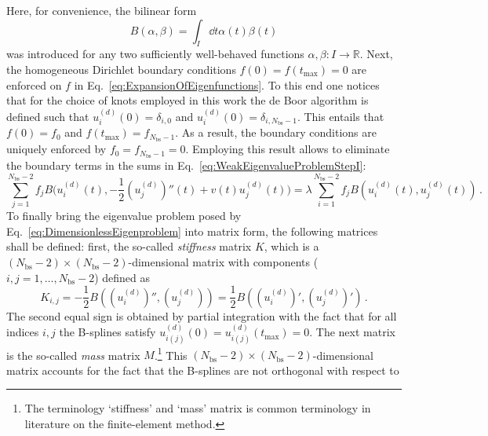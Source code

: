 \documentclass[fontsize=12pt,
               twoside=false,
               BCOR=0mm,
               DIV=14,
               overfullrule=false, %
               toc=bibliography,
               headinclude=true,
               footinclude=false]{scrartcl}
\numberwithin{equation}{section}
\begin{document}
    Here, for convenience, the bilinear form
    \begin{equation}\label{eq:BilinearForm}
        B(\alpha,\beta)
        =
        \int_I \dd{t} \alpha(t) \beta(t)
    \end{equation}
    was introduced for any two sufficiently well-behaved functions
    $\alpha,\beta\colon{I}\to\mathbb{R}$. Next, the homogeneous Dirichlet
    boundary conditions $f(0)=f(t_\mathrm{max})=0$ are enforced on $f$ in
    Eq.~\eqref{eq:ExpansionOfEigenfunctions}. To this end one notices that for
    the choice of knots employed in this work the de Boor algorithm
    \cite{deboor2001} is defined such that $u^{(d)}_i(0)=\delta_{i,0}$ and
    $u^{(d)}_i(0)=\delta_{i,N_\mathrm{bs}-1}$. This entails that $f(0)=f_0$ and
    $f(t_\mathrm{max})=f_{N_\mathrm{bs}-1}$. As a result, the boundary
    conditions are uniquely enforced by $f_0=f_{N_\mathrm{bs}-1}=0$. Employing
    this result allows to eliminate the boundary terms in the sums in
    Eq.~\eqref{eq:WeakEigenvalueProblemStepI}:
    \begin{equation}\label{eq:WeakEigenvalueProblemStepII}
        \sum^{N_\mathrm{bs}-2}_{j=1}
        f_j
        B\bigg(
            u^{(d)}_i(t),
            -\frac{1}{2}(u^{(d)}_j)''(t)+v(t)u^{(d)}_j(t)
        \bigg)
        =
        \lambda
        \sum^{N_\mathrm{bs}-2}_{i=1}
        f_j
        B(u^{(d)}_i(t), u^{(d)}_j(t))
    \,.
    \end{equation}
    To finally bring the eigenvalue problem posed by
    Eq.~\eqref{eq:DimensionlessEigenproblem} into matrix form, the following
    matrices shall be defined: first, the so-called \emph{stiffness} matrix $K$,
    which is a $(N_\mathrm{bs}-2)\times(N_\mathrm{bs}-2)$-dimensional matrix
    with components ($i,j=1,\dots,N_\mathrm{bs}-2$) defined as
    \begin{equation}
        K_{i,j}
        =
        -\frac{1}{2}
        B((u^{(d)}_i)'',(u^{(d)}_j))
        =
        \frac{1}{2}
        B((u^{(d)}_i)',(u^{(d)}_j)')
    \,.
    \end{equation}
    The second equal sign is obtained by partial integration with the fact that
    for all indices $i,j$ the B-splines satisfy
    $u^{(d)}_{i(j)}(0)=u^{(d)}_{i(j)}(t_\mathrm{max})=0$. The next matrix is the
    so-called \emph{mass} matrix $M$.\footnote{The terminology `stiffness' and
    `mass' matrix is common terminology in literature on the finite-element
    method.} This $(N_\mathrm{bs}-2)\times(N_\mathrm{bs}-2)$-dimensional matrix
    accounts for the fact that the B-splines are not orthogonal with respect to
\end{document}
